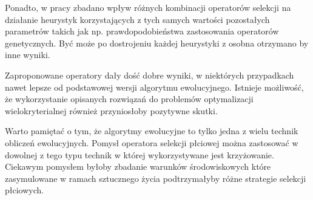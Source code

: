 \documentclass[./FM_mgr.tex]{subfiles}
\begin{document}
Ponadto, w pracy zbadano wpływ różnych kombinacji operatorów selekcji na działanie heurystyk korzystających z tych samych wartości pozostałych parametrów takich jak np. prawdopodobieństwa zastosowania operatorów genetycznych.
Być może po dostrojeniu każdej heurystyki z osobna otrzymano by inne wyniki.

Zaproponowane operatory dały dość dobre wyniki, w niektórych przypadkach nawet lepsze od podstawowej wersji algorytmu ewolucyjnego.
Istnieje możliwość, że wykorzystanie opisanych rozwiązań do problemów optymalizacji wielokryterialnej również przyniosłoby pozytywne skutki.

Warto pamiętać o tym, że algorytmy ewolucyjne to tylko jedna z wielu technik obliczeń ewolucyjnych.
Pomysł operatora selekcji płciowej można zastosować w dowolnej z tego typu technik w której wykorzystywane jest krzyżowanie.
Ciekawym pomysłem byłoby zbadanie warunków środowiskowych które zasymulowane w ramach sztucznego życia podtrzymałyby różne strategie selekcji płciowych.
\end{document}
